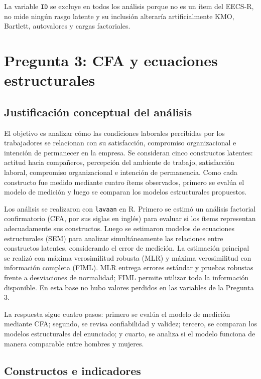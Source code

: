 \documentclass[12pt,letterpaper]{article}
\begin{document}
La variable \texttt{ID} se excluye en todos los análisis porque no es un ítem del EECS-R, no mide ningún rasgo latente y su inclusión alteraría artificialmente KMO, Bartlett, autovalores y cargas factoriales.

\newpage

\section{Pregunta 3: CFA y ecuaciones estructurales}

\subsection{Justificación conceptual del análisis}

El objetivo es analizar cómo las condiciones laborales percibidas por los trabajadores se relacionan con su satisfacción, compromiso organizacional e intención de permanecer en la empresa. Se consideran cinco constructos latentes: actitud hacia compañeros, percepción del ambiente de trabajo, satisfacción laboral, compromiso organizacional e intención de permanencia. Como cada constructo fue medido mediante cuatro ítems observados, primero se evalúa el modelo de medición y luego se comparan los modelos estructurales propuestos.

Los análisis se realizaron con \texttt{lavaan} en R. Primero se estimó un análisis factorial confirmatorio (CFA, por sus siglas en inglés) para evaluar si los ítems representan adecuadamente sus constructos. Luego se estimaron modelos de ecuaciones estructurales (SEM) para analizar simultáneamente las relaciones entre constructos latentes, considerando el error de medición. La estimación principal se realizó con máxima verosimilitud robusta (MLR) y máxima verosimilitud con información completa (FIML). MLR entrega errores estándar y pruebas robustas frente a desviaciones de normalidad; FIML permite utilizar toda la información disponible. En esta base no hubo valores perdidos en las variables de la Pregunta 3.

La respuesta sigue cuatro pasos: primero se evalúa el modelo de medición mediante CFA; segundo, se revisa confiabilidad y validez; tercero, se comparan los modelos estructurales del enunciado; y cuarto, se analiza si el modelo funciona de manera comparable entre hombres y mujeres.

\subsection{Constructos e indicadores}
\end{document}
